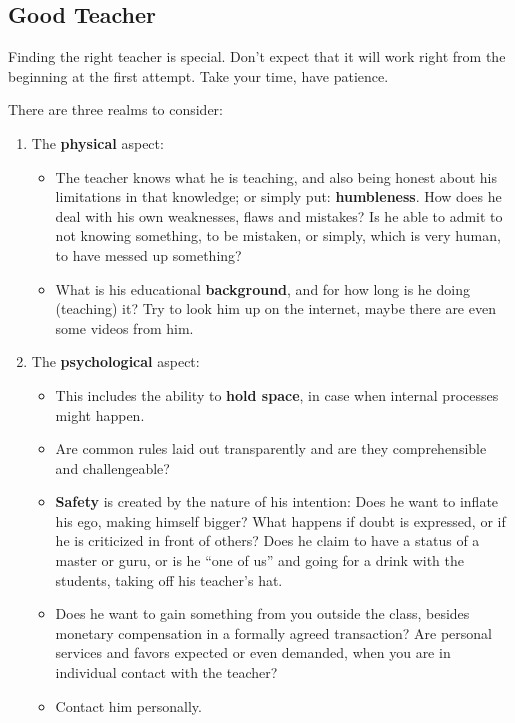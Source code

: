 \subsection{Good Teacher}\label{subsec:good-teacher}

Finding the right teacher is special.
Don’t expect that it will work right from the beginning at the first attempt.
Take your time, have patience.

There are three realms to consider:

\begin{enumerate}
    \item The \textbf{physical} aspect:
    \begin{itemize}
        \item The teacher knows what he is teaching, and also being honest about his limitations in that knowledge; or simply put: \textbf{humbleness}.
        How does he deal with his own weaknesses, flaws and mistakes?
        Is he able to admit to not knowing something, to be mistaken, or simply, which is very human, to have messed up something?
        \item What is his educational \textbf{background}, and for how long is he doing (teaching) it?
        Try to look him up on the internet, maybe there are even some videos from him.
    \end{itemize}
    \item The \textbf{psychological} aspect:
    \begin{itemize}
        \item This includes the ability to \textbf{hold space}, in case when internal processes might happen.
        \item Are common rules laid out transparently and are they comprehensible and challengeable?
        \item \textbf{Safety} is created by the nature of his intention: Does he want to inflate his ego, making himself bigger?
		What happens if doubt is expressed, or if he is criticized in front of others?
        Does he claim to have a status of a master or guru, or is he ``one of us'' and going for a drink with the students, taking off his teacher's hat.
        \item Does he want to gain something from you outside the class, besides monetary compensation in a formally agreed transaction?
        Are personal services and favors expected or even demanded, when you are in individual contact with the teacher?
        \item Contact him personally.

\end{itemize}
\end{enumerate}
